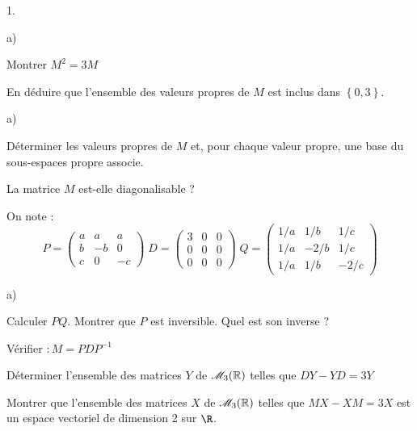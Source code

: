 \documentclass[11pt]{article}%
\begin{document}
\begin{noliste}{1.}
 \setlength{\itemsep}{4mm}
\item 
\begin{noliste}{a)}
 \setlength{\itemsep}{2mm}
\item Montrer $M^{2} = 3M$

\item En déduire que l'ensemble des valeurs propres de $M$ est inclus
dans $\left\{ 0,3\right\} $.
\end{noliste}

\item 
\begin{noliste}{a)}
 \setlength{\itemsep}{2mm}
\item Déterminer les valeurs propres de $M$ et, pour chaque valeur
propre, une base du sous-espaces propre associe.

\item La matrice $M$ est-elle diagonalisable ?
\end{noliste}

\hspace{-1cm}On note : 
\[
P = \left( 
\begin{array}{ccc}
a & a & a \\
b & -b & 0 \\
c & 0 & -c
\end{array}
\right) \;D = \left( 
\begin{array}{lll}
3 & 0 & 0 \\
0 & 0 & 0 \\
0 & 0 & 0
\end{array}
\right) \;Q = \left( 
\begin{array}{ccc}
1/a & 1/b & 1/c \\
1/a & -2/b & 1/c \\
1/a & 1/b & -2/c
\end{array}
\right) 
\]

\item 
\begin{noliste}{a)}
 \setlength{\itemsep}{2mm}
\item Calculer $PQ$. Montrer que $P$ est inversible. Quel est son
inverse ?

\item Vérifier $ :M = PDP^{-1}$
\end{noliste}

\item Déterminer l'ensemble des matrices $Y$ de $\mathscr{M}_{3}(\mathbb{R}) $ telles que
$DY-YD = 3Y$

\item Montrer que l'ensemble des matrices $X$ de $\mathscr{M}_{3}(\mathbb{R}) $ telles que
$MX-XM = 3X$ est un espace vectoriel de
dimension 2 sur $\R$.
\end{noliste}
\end{document}
